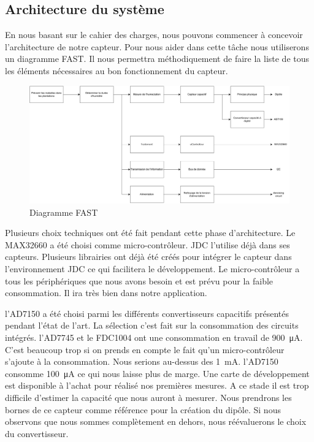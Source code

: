 \subsection{Architecture du système}

En nous basant sur le cahier des charges, nous pouvons commencer à concevoir l'architecture de notre capteur. Pour nous aider dans cette tâche nous utiliserons un diagramme FAST. Il nous permettra méthodiquement de faire la liste de tous les éléments nécessaires au bon fonctionnement du capteur.

\begin{figure}[!ht]
 \centering
 \includegraphics[width=16cm]{DiagrammeFAST.pdf}
 \caption{Diagramme FAST}
\end{figure}

Plusieurs choix techniques ont été fait pendant cette phase d'architecture. Le MAX32660 a été choisi comme micro-contrôleur. JDC l'utilise déjà dans ses capteurs. Plusieurs librairies ont déjà été créés pour intégrer le capteur dans l’environnement JDC ce qui facilitera le développement. Le micro-contrôleur a tous les périphériques que nous avons besoin et est prévu pour la faible consommation. Il ira très bien dans notre application.


l'AD7150 a été choisi parmi les différents convertisseurs capacitifs présentés pendant l'état de l'art. La sélection c'est fait sur la consommation des circuits intégrés. l'AD7745 et le FDC1004 ont une consommation en travail de  \SI{900}{\micro\ampere}. C'est beaucoup trop si on prends en compte le fait qu'un micro-contrôleur s'ajoute à la consommation. Nous serions au-dessus des \SI{1}{\milli\ampere}. l'AD7150 consomme \SI{100}{\micro\ampere} ce qui nous laisse plus de marge. Une carte de développement est disponible à l'achat pour réalisé nos premières mesures. A ce stade il est trop difficile d'estimer la capacité que nous auront à mesurer. Nous prendrons les bornes de ce capteur comme référence pour la création du dipôle. Si nous observons que nous sommes complètement en dehors, nous réévaluerons le choix du convertisseur.

